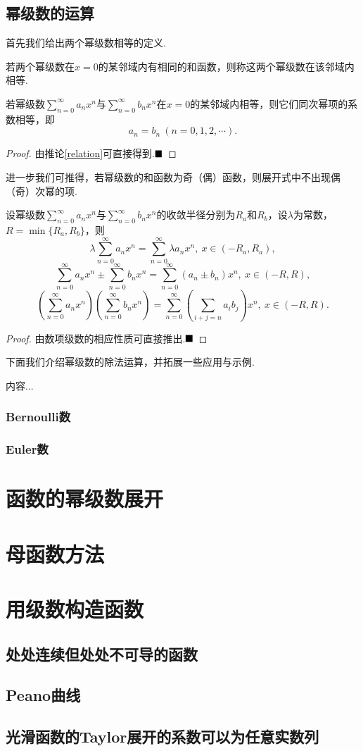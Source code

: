 \subsection{幂级数的运算}
首先我们给出两个幂级数相等的定义.
\begin{definition}[幂级数相等]
	若两个幂级数在$x=0$的某邻域内有相同的和函数，则称这两个幂级数在该邻域内相等.
\end{definition}
\begin{theorem}
	若幂级数$\displaystyle\sum_{n=0}^{\infty}a_nx^n$与$\displaystyle\sum_{n=0}^{\infty}b_nx^n$在$x=0$的某邻域内相等，则它们同次幂项的系数相等，即
	$$a_n=b_n\ (n=0,1,2,\cdots).$$
\end{theorem}
\begin{proof}
	由推论\ref{relation}可直接得到.$\hfill\blacksquare$
\end{proof}
\begin{remark}
	进一步我们可推得，若幂级数的和函数为奇（偶）函数，则展开式中不出现偶（奇）次幂的项.
\end{remark}
\begin{theorem}[运算法则]
	设幂级数$\displaystyle\sum_{n=0}^{\infty}a_nx^n$与$\displaystyle\sum_{n=0}^{\infty}b_nx^n$的收敛半径分别为$R_a$和$R_b$，设$\lambda$为常数，$R=\min\{R_a,R_b\}$，则
	$$\lambda\sum_{n=0}^{\infty}a_nx^n=\sum_{n=0}^{\infty}\lambda a_nx^n,\ x\in(-R_a,R_a),$$
	$$\sum_{n=0}^{\infty}a_nx^n\pm\sum_{n=0}^{\infty}b_nx^n=\sum_{n=0}^{\infty}(a_n\pm b_n)x^n,\ x\in(-R,R),$$
	$$\left(\sum_{n=0}^{\infty}a_nx^n\right)\left(\sum_{n=0}^{\infty}b_nx^n\right)=\sum_{n=0}^{\infty}\left(\sum_{i+j=n}a_ib_j\right)x^n,\ x\in(-R,R).$$
\end{theorem}
\begin{proof}
	由数项级数的相应性质可直接推出.$\hfill\blacksquare$
\end{proof}
下面我们介绍幂级数的除法运算，并拓展一些应用与示例.
\begin{theorem}[幂级数的除法]
	内容...
\end{theorem}
\subsubsection{Bernoulli数}
\subsubsection{Euler数}
\section{函数的幂级数展开}
\section{母函数方法}
\section{用级数构造函数}
\subsection{处处连续但处处不可导的函数}
\subsection{Peano曲线}
\subsection{光滑函数的Taylor展开的系数可以为任意实数列}
